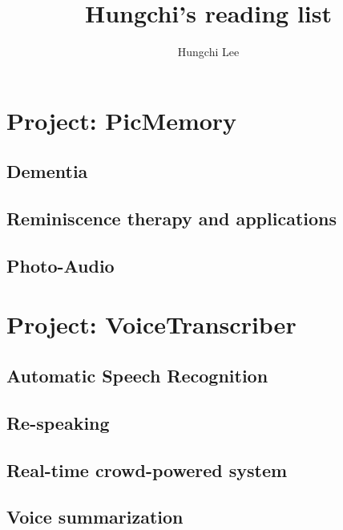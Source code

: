 \documentclass[a4paper]{article}
\title{\textbf{Hungchi's reading list}}
\author{Hungchi Lee}
\begin{document}
\maketitle

\section{Project: PicMemory}

\subsection{Dementia}
\cite{woods2005reminiscence,green2012assisting,dijkstra2004conversational}

\subsection{Reminiscence therapy and applications}
\cite{woods2005reminiscence,gowans2004designing,mizen2004scrapbook,west2007memento,piper2013audio,landry2006itell,webster2010mapping,westerhof2010reminiscence}

\subsection{Photo-Audio}
\cite{stifelman2001audio,pearson2015paperchains}

\section{Project: VoiceTranscriber}
\subsection{Automatic Speech Recognition}
\cite{silsbee1996computer}

\subsection{Re-speaking}
\cite{imai2002speech}

\subsection{Real-time crowd-powered system}
\cite{lasecki2012real,wald2006creating,harada2013accessible,lasecki2013warping}

\subsection{Voice summarization}
\cite{kazantseva2010summarizing,koumpis2000transcription,fuentes2005summarizing,kikuchi2003automatic}

 

\end{document}
